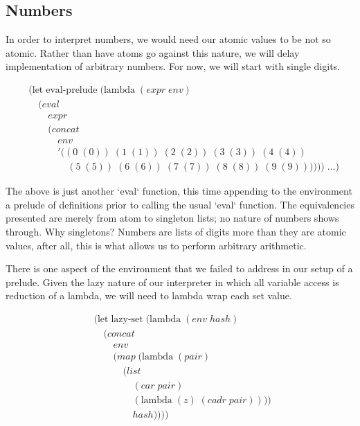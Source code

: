 \subsection{Numbers}
In order to interpret numbers, we would need our atomic values to be not so 
atomic. Rather than have atoms go against this nature, we will delay 
implementation of arbitrary numbers. For now, we will start with single 
digits.

\begin{align*}
& (\text{let} \; \text{eval-prelude} \; (\text{lambda} \; (expr \; env)
\\& \quad (eval \; 
\\& \qquad expr
\\& \qquad (concat \; 
\\& \qquad \quad env \; 
\\& \qquad \quad '((0 \; (0)) \; (1 \; (1)) \; (2 \; (2)) \; (3 \; (3)) \; (4 \; (4)) \; 
\\& \qquad \qquad (5 \; (5)) \; (6 \; (6)) \; (7 \; (7)) \; (8 \; (8)) \; (9 \; (9)))))) \; \dots)
\end{align*}

The above is just another `eval` function, this time appending to the 
environment a prelude of definitions prior to calling the usual `eval` 
function. The equivalencies presented are merely from atom to singleton 
lists; no nature of numbers shows through. Why singletons? Numbers are lists 
of digits more than they are atomic values, after all, this is what allows us 
to perform arbitrary arithmetic.

There is one aspect of the environment that we failed to address in our setup 
of a prelude. Given the lazy nature of our interpreter in which all variable
access is reduction of a lambda, we will need to lambda wrap each set value.

\begin{align*}
& (\text{let} \; \text{lazy-set} \; (\text{lambda} \; (env \; hash)
\\& \quad (concat
\\& \qquad env
\\& \qquad (map \; (\text{lambda} \; (pair) \; 
\\& \qquad \quad (list \; 
\\& \qquad \qquad (car \; pair) \; 
\\& \qquad \qquad (\text{lambda} \; (z) \; (cadr \; pair)))) \; 
\\& \qquad \qquad hash))))
\end{align*}

